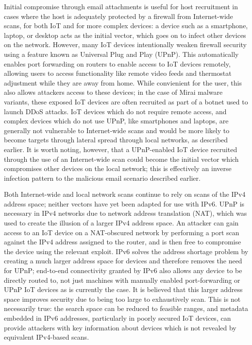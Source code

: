 \documentclass[10pt,sigconf]{acmart}
\begin{document}
Initial compromise through email attachments is useful for host recruitment in cases where the host is adequately protected by a firewall from Internet-wide scans, for both IoT and for more complex devices:
a device such as a smartphone, laptop, or desktop acts as the initial vector, which goes on to infect other devices on the network.
However, many IoT devices intentionally weaken firewall security using a feature known as Universal Plug and Play (UPnP).
This automatically enables port forwarding on routers to enable access to IoT devices remotely, allowing users to access functionality like remote video feeds and thermostat adjustment while they are away from home.
While convienient for the user, this also allows attackers access to these devices;
in the case of Mirai malware variants, these exposed IoT devices are often recruited as part of a botnet used to launch DDoS attacks.
IoT devices which do not require remote access, and complex devices which do not use UPnP, like smartphones and laptops, are generally not vulnerable to Internet-wide scans and would be more likely to become targets through lateral spread through local networks, as described earlier.
It is worth noting, however, that a UPnP-enabled IoT device recruited through the use of an Internet-wide scan could become the initial vector which compromises other devices on the local network;
this is effectively an inverse infection pattern to the malicious email scenario described earlier.


Both Internet-wide and local network scans continue to rely on scans of the IPv4 address space;
neither vectors have yet been adapted for use with IPv6.
UPnP is necessary in IPv4 networks due to network address translation (NAT), which was used to create the illusion of a larger IPv4 address space.
An attacker can gain access to an IoT device on a NAT-obscured network by performing a port scan against the IPv4 address assigned to the router, and is then free to compromise the device using the relevant exploit.
IPv6 solves the address shortage problem by creating a much larger address space for devices and therefore removes the need for UPnP;
end-to-end connectivity granted by IPv6 also allows any device to be directly routed to, not just machines with manually enabled port-forwarding or UPnP IoT devices as is currently the case.
It is believed that this larger address space improves security due to being too large to exhaustively scan.
This is not necessarily true:
the search space can be reduced to feasible ranges, and metadata embedded in IPv6 addresses, particularly in poorly secured IoT devices, can provide attackers with key information about devices which is not revealed by equivalent IPv4-based scans.
\end{document}
